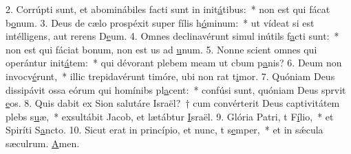 2. Corrúpti sunt, et abominábiles facti sunt in init\uline{á}tibus:~* non est qui fácat b\uline{o}num.
3. Deus de cælo prospéxit super fílis h\uline{ó}minum:~* ut vídeat si est intélligens, aut rerens D\uline{e}um.
4. Omnes declinavérunt simul inútils f\uline{a}cti sunt:~* non est qui fáciat bonum, non est us ad \uline{u}num.
5. Nonne scient omnes qui operántur init\uline{á}tem:~* qui dévorant plebem meam ut cbum p\uline{a}nis?
6. Deum non invocv\uline{é}runt,~* illic trepidavérunt timóre, ubi non rat t\uline{i}mor.
7. Quóniam Deus dissipávit ossa eórum qui homínibs pl\uline{a}cent:~* confúsi sunt, quóniam Deus sprvit \uline{e}os.
8. Quis dabit ex Sion salutáre Israël?~† cum convérterit Deus captivitátem plebs s\uline{u}æ,~* exsultábit Jacob, et lætábtur \uline{I}sraël.
9. Glória Patri, t F\uline{í}lio,~* et Spiríti S\uline{a}ncto.
10. Sicut erat in princípio, et nunc, t s\uline{e}mper,~* et in sǽcula sæculrum. \uline{A}men.
